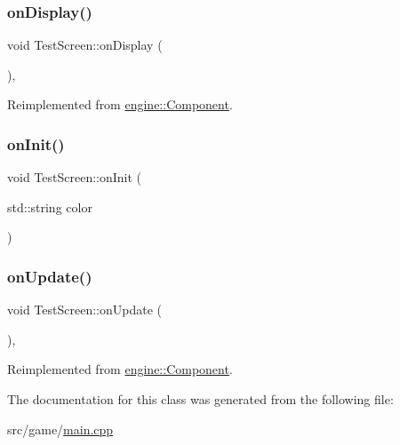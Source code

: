\mbox{\label{class_test_screen_a3ea48247e6a1db6d6f2e703b5d433f35}} 
\subsubsection{\texorpdfstring{on\+Display()}{onDisplay()}}
{\footnotesize\ttfamily void Test\+Screen\+::on\+Display (\begin{DoxyParamCaption}{ }\end{DoxyParamCaption})\hspace{0.3cm}{\ttfamily [inline]}, {\ttfamily [virtual]}}



Reimplemented from \mbox{\hyperlink{classengine_1_1_component_a86a7778d8754130072dbea2b1901728e}{engine\+::\+Component}}.

\mbox{\label{class_test_screen_ae625f31a4606b32dca57b0049ab482c0}} 
\subsubsection{\texorpdfstring{on\+Init()}{onInit()}}
{\footnotesize\ttfamily void Test\+Screen\+::on\+Init (\begin{DoxyParamCaption}\item[{std\+::string}]{color }\end{DoxyParamCaption})\hspace{0.3cm}{\ttfamily [inline]}}

\mbox{\label{class_test_screen_a991300ebe46989b859a2c68a15e9cad4}} 
\subsubsection{\texorpdfstring{on\+Update()}{onUpdate()}}
{\footnotesize\ttfamily void Test\+Screen\+::on\+Update (\begin{DoxyParamCaption}{ }\end{DoxyParamCaption})\hspace{0.3cm}{\ttfamily [inline]}, {\ttfamily [virtual]}}



Reimplemented from \mbox{\hyperlink{classengine_1_1_component_a3b256388549dbdeead09ebe7bd3ca0e6}{engine\+::\+Component}}.



The documentation for this class was generated from the following file\+:\begin{DoxyCompactItemize}
\item 
src/game/\mbox{\hyperlink{main_8cpp}{main.\+cpp}}\end{DoxyCompactItemize}
